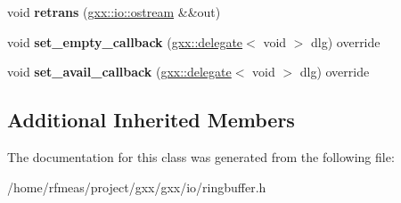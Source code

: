 \begin{DoxyCompactItemize}
\item 
void {\bfseries retrans} (\hyperlink{classgxx_1_1io_1_1ostream}{gxx\+::io\+::ostream} \&\&out)\hypertarget{classgxx_1_1io_1_1ringbuffer_a865882a68c6cdcc18e7eb69d67b495ba}{}\label{classgxx_1_1io_1_1ringbuffer_a865882a68c6cdcc18e7eb69d67b495ba}

\item 
void {\bfseries set\+\_\+empty\+\_\+callback} (\hyperlink{classgxx_1_1delegate}{gxx\+::delegate}$<$ void $>$ dlg) override\hypertarget{classgxx_1_1io_1_1ringbuffer_a8429b18d1a51fcd258fd7ffc630f5194}{}\label{classgxx_1_1io_1_1ringbuffer_a8429b18d1a51fcd258fd7ffc630f5194}

\item 
void {\bfseries set\+\_\+avail\+\_\+callback} (\hyperlink{classgxx_1_1delegate}{gxx\+::delegate}$<$ void $>$ dlg) override\hypertarget{classgxx_1_1io_1_1ringbuffer_ada53f514b9b5511d308c61d4a739682a}{}\label{classgxx_1_1io_1_1ringbuffer_ada53f514b9b5511d308c61d4a739682a}

\end{DoxyCompactItemize}
\subsection*{Additional Inherited Members}


The documentation for this class was generated from the following file\+:\begin{DoxyCompactItemize}
\item 
/home/rfmeas/project/gxx/gxx/io/ringbuffer.\+h\end{DoxyCompactItemize}
